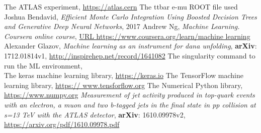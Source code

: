 \documentclass[a4paper,11pt,twoside]{article}
\begin{document}
\begin{thebibliography}{11}

 The ATLAS experiment, \url{https://atlas.cern}
 The ttbar e-mu ROOT file used {\tiny \texttt{}}
 Joshua Bendavid, \textit{Efficient Monte Carlo Integration Using Boosted Decision Trees and Generative Deep Neural Networks}, 2017
 Andrew Ng, \textit{Machine Learning. Coursera online course}, \url{URL https://www.coursera.org/learn/machine learning}
 Alexander Glazov, \textit{Machine learning as an instrument for dana unfolding}, \textbf{arXiv}: 1712.01814v1, \url{http://inspirehep.net/record/1641082}
 The singularity command to run the ML environment, \\ {\tiny \texttt {}}
 The keras machine learning library, \url{https://keras.io}
 The TensorFlow machine learning library, \url{https:// www.tensforflow.org}
 The Numerical Python library, \url{https://www.numpy.org}
 \textit{Measurement of jet activity produced in top-quark events with an electron, a muon and two b-tagged jets in the final state in pp collision at s=13 TeV with the ATLAS detector}, \textbf{arXiv}: 1610.09978v2, \url{https://arxiv.org/pdf/1610.09978.pdf} 
\end{thebibliography}
\end{document}
